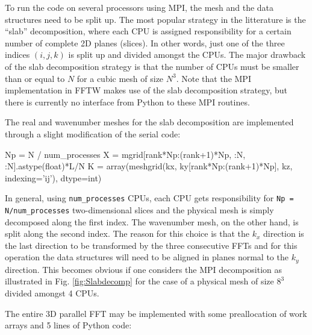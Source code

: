 \documentclass[11pt, oneside]{article}
\newcommand{\inpyth}{\lstinline[style=pythonstyle, basicstyle=\ttfamily]} %[]%
\begin{document}
To run the code on several processors using MPI, the mesh and the data structures need to be split up. The most popular strategy in the litterature is the ``slab'' decomposition, where each CPU is assigned responsibility for a certain number of complete 2D planes (slices). In other words, just one of the three indices $(i,j,k)$ is split up and divided amongst the CPUs. The major drawback of the slab decomposition strategy is that the number of CPUs must be smaller than or equal to $N$ for a cubic mesh of size $N^3$. Note that the MPI implementation in FFTW makes use of the slab decomposition strategy, but there is currently no interface from Python to these MPI routines.

The real and wavenumber meshes for the slab decomposition are implemented through a slight modification of the serial code:

\begin{python}
Np = N / num_processes
X = mgrid[rank*Np:(rank+1)*Np, :N, :N].astype(float)*L/N
K = array(meshgrid(kx, ky[rank*Np:(rank+1)*Np], kz, 
                   indexing='ij'), dtype=int)
\end{python}
In general, using \inpyth{num_processes} CPUs, each CPU gets responsibility for \inpyth{Np = N/num_processes} two-dimensional slices and the physical mesh is simply decomposed along the first index. The wavenumber mesh, on the other hand, is split along the second index. The reason for this choice is that the $k_x$ direction is the last direction to be transformed by the three consecutive FFTs and for this operation the data structures will need to be aligned in planes normal to the $k_y$ direction. This becomes obvious if one considers the MPI decomposition as illustrated in Fig. \ref{fig:Slabdecomp} for the case of a physical mesh of size $8^3$ divided amongst 4 CPUs.

The entire 3D parallel FFT may be implemented with some preallocation of work arrays and 5 lines of Python code:
\end{document}
